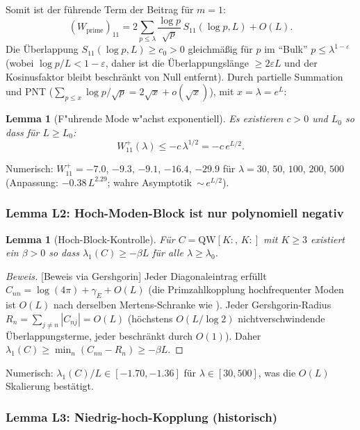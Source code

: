 \documentclass[12pt,a4paper]{article}
\newtheorem{lemma}[theorem]{Lemma}
\theoremstyle{definition}
\theoremstyle{remark}
\begin{document}
Somit ist der führende Term der Beitrag für $m = 1$:
\begin{equation}
\label{eq:W11-m1}
  (W_{\mathrm{prime}})_{11} = 2\sum_{p \leq \lambda} \frac{\log p}{\sqrt{p}}\,S_{11}(\log p, L) + O(L).
\end{equation}
Die Überlappung $S_{11}(\log p, L) \geq c_0 > 0$ gleichmäßig für $p$ im ``Bulk'' $p \leq \lambda^{1-\varepsilon}$ (wobei $\log p / L < 1 - \varepsilon$, daher ist die Überlappungslänge $\geq 2\varepsilon L$ und der Kosinusfaktor bleibt beschränkt von Null entfernt). Durch partielle Summation und PNT ($\sum_{p \leq x} \log p / \sqrt{p} = 2\sqrt{x} + o(\sqrt{x})$), mit $x = \lambda = e^L$:

\begin{lemma}[F"uhrende Mode w"achst exponentiell]
\label{lem:L1}
Es existieren $c > 0$ und $L_0$ so dass für $L \geq L_0$:
\[
  W_{11}^+(\lambda) \leq -c\,\lambda^{1/2} = -c\,e^{L/2}.
\]
\end{lemma}

\noindent Numerisch: $W_{11}^+ = -7.0$, $-9.3$, $-9.1$, $-16.4$, $-29.9$ für $\lambda = 30$, $50$, $100$, $200$, $500$ (Anpassung: $-0.38\,L^{2.29}$; wahre Asymptotik~${\sim}\, e^{L/2}$).

\subsubsection{Lemma L2: Hoch-Moden-Block ist nur polynomiell negativ}

\begin{lemma}[Hoch-Block-Kontrolle]
\label{lem:L2}
Für $C = \mathrm{QW}[K{:},\,K{:}]$ mit $K \geq 3$ existiert ein $\beta > 0$ so dass $\lambda_1(C) \geq -\beta L$ für alle $\lambda \geq \lambda_0$.
\end{lemma}
\begin{proof}[Beweis][Beweis via Gershgorin]
Jeder Diagonaleintrag erfüllt $C_{nn} = \log(4\pi) + \gamma_E + O(L)$ (die Primzahlkopplung hochfrequenter Moden ist $O(L)$ nach derselben Mertens-Schranke wie ). Jeder Gershgorin-Radius $R_n = \sum_{j \neq n} |C_{nj}| = O(L)$ (höchstens $O(L/\log 2)$ nichtverschwindende Überlappungsterme, jeder beschränkt durch $O(1)$). Daher $\lambda_1(C) \geq \min_n(C_{nn} - R_n) \geq -\beta L$.
\end{proof}

\noindent Numerisch: $\lambda_1(C)/L \in [-1.70, -1.36]$ für $\lambda \in [30, 500]$, was die $O(L)$ Skalierung bestätigt.

\subsubsection{Lemma L3: Niedrig-hoch-Kopplung (historisch)}
\end{document}

